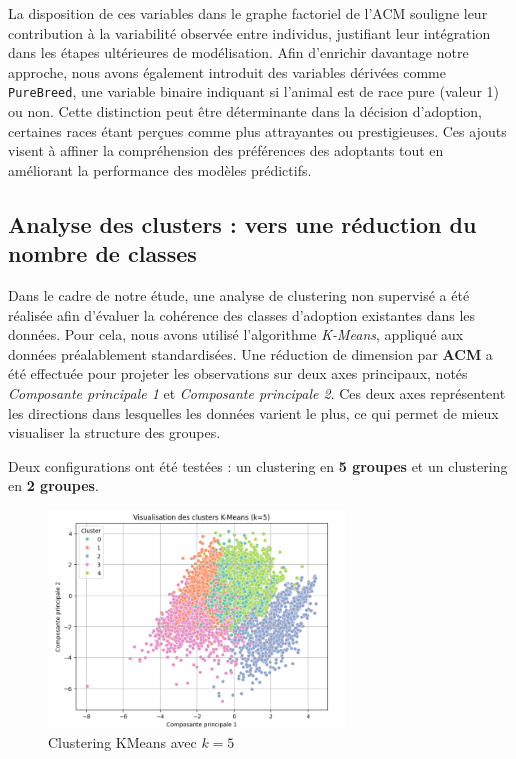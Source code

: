 \documentclass[a4paper,12pt]{article}
\begin{document}
La disposition de ces variables dans le graphe factoriel de l’ACM souligne leur contribution à la variabilité observée entre individus, justifiant leur intégration dans les étapes ultérieures de modélisation. Afin d’enrichir davantage notre approche, nous avons également introduit des variables dérivées comme \texttt{PureBreed}, une variable binaire indiquant si l’animal est de race pure (valeur 1) ou non. Cette distinction peut être déterminante dans la décision d’adoption, certaines races étant perçues comme plus attrayantes ou prestigieuses. Ces ajouts visent à affiner la compréhension des préférences des adoptants tout en améliorant la performance des modèles prédictifs.

 

\subsection{Analyse des clusters : vers une réduction du nombre de classes}

Dans le cadre de notre étude, une analyse de clustering non supervisé a été réalisée afin d’évaluer la cohérence des classes d’adoption existantes dans les données. Pour cela, nous avons utilisé l’algorithme \textit{K-Means}, appliqué aux données préalablement standardisées. Une réduction de dimension par \textbf{ACM}  a été effectuée pour projeter les observations sur deux axes principaux, notés \textit{Composante principale 1} et \textit{Composante principale 2}. Ces deux axes représentent les directions dans lesquelles les données varient le plus, ce qui permet de mieux visualiser la structure des groupes.

Deux configurations ont été testées : un clustering en \textbf{5 groupes} et un clustering en \textbf{2 groupes}.

\begin{figure}[H]
    \centering
    \includegraphics[width=0.7\textwidth]{graph_kmeans_5.png}
    \caption{Clustering KMeans avec $k=5$}
    \label{fig:kmeans_5}
\end{figure}
\end{document}
